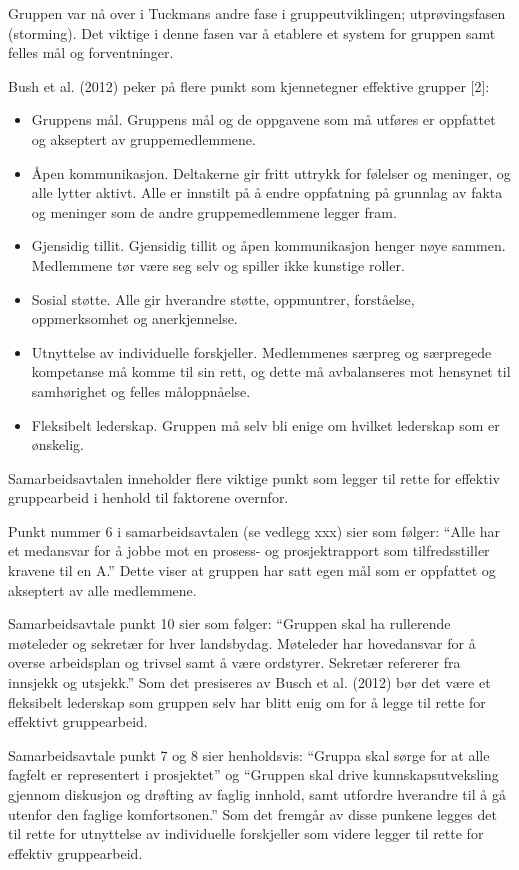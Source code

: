 Gruppen var nå over i Tuckmans andre fase i gruppeutviklingen; utprøvingsfasen (storming). Det viktige i denne fasen var å etablere et system for gruppen samt felles mål og forventninger. 

Bush et al. (2012) peker på flere punkt som kjennetegner effektive grupper [2]:

\begin{itemize}
	\item Gruppens mål. Gruppens mål og de oppgavene som må utføres er oppfattet og akseptert av gruppemedlemmene.
	\item Åpen kommunikasjon. Deltakerne gir fritt uttrykk for følelser og meninger, og alle lytter aktivt. Alle er innstilt på å endre oppfatning på grunnlag av fakta og meninger som de andre gruppemedlemmene legger fram.
	\item Gjensidig tillit. Gjensidig tillit og åpen kommunikasjon henger nøye sammen. Medlemmene tør være seg selv og spiller ikke kunstige roller.
	\item Sosial støtte. Alle gir hverandre støtte, oppmuntrer, forståelse, oppmerksomhet og anerkjennelse.
	\item Utnyttelse av individuelle forskjeller. Medlemmenes særpreg og særpregede kompetanse må komme til sin rett, og dette må avbalanseres mot hensynet til samhørighet og felles måloppnåelse.
	\item Fleksibelt lederskap. Gruppen må selv bli enige om hvilket lederskap som er ønskelig.
\end{itemize}

Samarbeidsavtalen inneholder flere viktige punkt som legger til rette for effektiv gruppearbeid i henhold til faktorene overnfor.

Punkt nummer 6 i samarbeidsavtalen (se vedlegg xxx) sier som følger:
“Alle har et medansvar for å jobbe mot en prosess- og prosjektrapport som tilfredsstiller kravene til en A.”
Dette viser at gruppen har satt egen mål som er oppfattet og akseptert av alle medlemmene.

Samarbeidsavtale punkt 10 sier som følger:
“Gruppen skal ha rullerende møteleder og sekretær for hver landsbydag.
Møteleder har hovedansvar for å overse arbeidsplan og trivsel samt å være ordstyrer.
Sekretær refererer fra innsjekk og utsjekk.”
Som det presiseres av Busch et al. (2012) bør det være et fleksibelt lederskap som gruppen selv har blitt enig om for å legge til rette for effektivt gruppearbeid.

Samarbeidsavtale punkt 7 og 8 sier henholdsvis:
“Gruppa skal sørge for at alle fagfelt er representert i prosjektet” og “Gruppen skal drive kunnskapsutveksling gjennom diskusjon og drøfting av faglig innhold, samt utfordre hverandre til å gå utenfor den faglige komfortsonen.”
Som det fremgår av disse punkene legges det til rette for utnyttelse av individuelle forskjeller som videre legger til rette for effektiv gruppearbeid.

